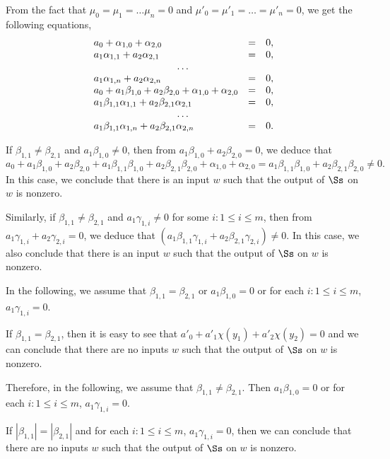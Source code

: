 From the fact that $\mu_0=\mu_1 = \dots \mu_n =0$ and $\mu'_0=\mu'_1=\dots = \mu'_n=0$, we get the following equations, 
\[
\begin{array}{l c l}
a_0 + \alpha_{1,0}+\alpha_{2,0} & = & 0,\\
a_1 \alpha_{1,1} + a_2 \alpha_{2,1} & = & 0,\\
\multicolumn{3}{c}{\dots}  \\
a_1 \alpha_{1,n} + a_2 \alpha_{2,n} & = & 0, \\
a_0 + a_1 \beta_{1,0} + a_2 \beta_{2,0} + \alpha_{1,0}+ \alpha_{2,0}  & =  & 0,\\
a_1\beta_{1,1} \alpha_{1,1} + a_2 \beta_{2,1} \alpha_{2,1} & = & 0,\\
\multicolumn{3}{c}{\dots}  \\
a_1\beta_{1,1} \alpha_{1,n} + a_2 \beta_{2,1} \alpha_{2,n}  & = & 0.
\end{array}
\] 

If $\beta_{1,1} \neq \beta_{2,1}$ and $a_1 \beta_{1,0} \neq 0$, then from $a_1 \beta_{1,0} + a_2 \beta_{2,0} =0$, we deduce that 
\[a_0 + a_1 \beta_{1,0} + a_2 \beta_{2,0} + a_1 \beta_{1,1} \beta_{1,0} + a_2 \beta_{2,1} \beta_{2,0} + \alpha_{1,0} + \alpha_{2,0} = a_1 \beta_{1,1} \beta_{1,0} + a_2 \beta_{2,1} \beta_{2,0} \neq 0.\]
In this case, we conclude that there is an input $w$ such that the output of $\Ss$ on $w$ is nonzero.

Similarly, if $\beta_{1,1} \neq \beta_{2,1}$ and $a_1 \gamma_{1,i} \neq 0$ for some $i: 1 \le i \le m$, then from $a_1 \gamma_{1,i} + a_2 \gamma_{2,i} =0$, we deduce that 
$(a_1 \beta_{1,1}\gamma_{1,i} + a_2 \beta_{2,1} \gamma_{2,i}) \neq 0$. In this case, we also conclude that there is an input $w$ such that the output of $\Ss$ on $w$ is nonzero.

In the following, we assume that $\beta_{1,1} = \beta_{2,1}$ or $a_1 \beta_{1,0} = 0$ or for each $i: 1 \le i \le m$, $a_1 \gamma_{1,i} = 0$.

If $\beta_{1,1} = \beta_{2,1}$, then it is easy to see that $a'_0 + a'_1 \chi(y_1)+ a'_2 \chi(y_2) = 0$ and we can conclude that there are no inputs $w$ such that the output of $\Ss$ on $w$ is nonzero.

Therefore, in the following, we assume that $\beta_{1,1} \neq \beta_{2,1}$. Then $a_1 \beta_{1,0} = 0$ or for each $i: 1 \le i \le m$, $a_1 \gamma_{1,i} = 0$. 

If $|\beta_{1,1}| =|\beta_{2,1}|$ and for each $i: 1 \le i \le m$, $a_1 \gamma_{1,i} = 0$, then we can conclude that there are no inputs $w$ such that the output of $\Ss$ on $w$ is nonzero.

